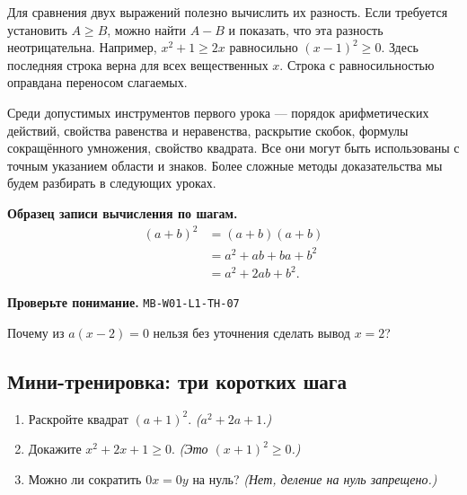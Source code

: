 \documentclass[11pt,a4paper,openany]{book}
\newcommand{\muid}[1]{\texttt{\footnotesize #1}}
\newcommand{\mathshowcase}{%
\[\begin{aligned}
(a+b)^2 &= (a+b)(a+b)\\
        &= a^2+ab+ba+b^2\\
        &= a^2+2ab+b^2.
\end{aligned}\]}
\begin{document}
Для сравнения двух выражений полезно вычислить их разность. Если требуется установить $A\ge B$, можно найти $A-B$ и показать, что эта разность неотрицательна. Например, $x^2+1\ge2x$ равносильно $(x-1)^2\ge0$. Здесь последняя строка верна для всех вещественных $x$. Строка с равносильностью оправдана переносом слагаемых.


Среди допустимых инструментов первого урока — порядок арифметических действий, свойства равенства и неравенства, раскрытие скобок, формулы сокращённого умножения, свойство квадрата. Все они могут быть использованы с точным указанием области и знаков. Более сложные методы доказательства мы будем разбирать в следующих уроках.


\noindent\textbf{Образец записи вычисления по шагам.}
\mathshowcase

\begin{center}
\end{center}

\begin{learnbox}\textbf{Проверьте понимание.} \muid{MB-W01-L1-TH-07}\par Почему из $a(x-2)=0$ нельзя без уточнения сделать вывод $x=2$?\end{learnbox}

\subsection*{Мини-тренировка: три коротких шага}
\begin{enumerate}[label=\arabic*),leftmargin=*,itemsep=3pt]

\item Раскройте квадрат $(a+1)^2$. \textit{($a^2+2a+1$.)}

\item Докажите $x^2+2x+1\ge0$. \textit{(Это $(x+1)^2\ge0$.)}

\item Можно ли сократить $0x=0y$ на нуль? \textit{(Нет, деление на нуль запрещено.)}

\end{enumerate}
\end{document}

